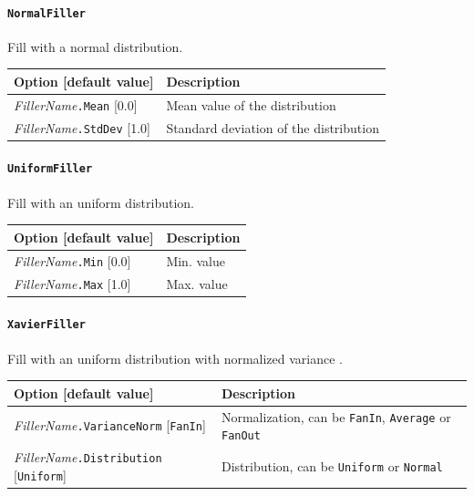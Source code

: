 \documentclass[a4paper,11pt,oneside]{article}
\begin{document}
\paragraph{\texorpdfstring{%
\lstinline[basicstyle=\ttfamily\bfseries]!NormalFiller!}{NormalFiller}}
Fill with a normal distribution.

\begin{center}
 \begin{tabular}{| p{5cm} | p{10cm} | }
 \hline
 Option [default value] & Description\\
 \hline\hline
    \emph{FillerName}\lstinline!.Mean! [0.0] & Mean value of the distribution \\
    \emph{FillerName}\lstinline!.StdDev! [1.0] & Standard deviation of the
    distribution \\
 \hline
\end{tabular}
\end{center}

\paragraph{\texorpdfstring{%
\lstinline[basicstyle=\ttfamily\bfseries]!UniformFiller!}{UniformFiller}}
Fill with an uniform distribution.

\begin{center}
 \begin{tabular}{| p{5cm} | p{10cm} | }
 \hline
 Option [default value] & Description\\
 \hline\hline
    \emph{FillerName}\lstinline!.Min! [0.0] & Min. value \\
    \emph{FillerName}\lstinline!.Max! [1.0] & Max. value \\
 \hline
\end{tabular}
\end{center}


\paragraph{\label{par:XavierFiller}\texorpdfstring{%
\lstinline[basicstyle=\ttfamily\bfseries]!XavierFiller!}{XavierFiller}}
Fill with an uniform distribution with normalized variance \citep{Glorot2010}.

\begin{center}
 \begin{tabular}{| p{5cm} | p{10cm} | }
 \hline
 Option [default value] & Description\\
 \hline\hline
    \emph{FillerName}\lstinline!.VarianceNorm! [\lstinline!FanIn!]
    & Normalization, can be \lstinline!FanIn!, \lstinline!Average!
    or \lstinline!FanOut! \\
    \emph{FillerName}\lstinline!.Distribution! [\lstinline!Uniform!]
    & Distribution, can be \lstinline!Uniform! or \lstinline!Normal! \\
 \hline
\end{tabular}
\end{center}
\end{document}
